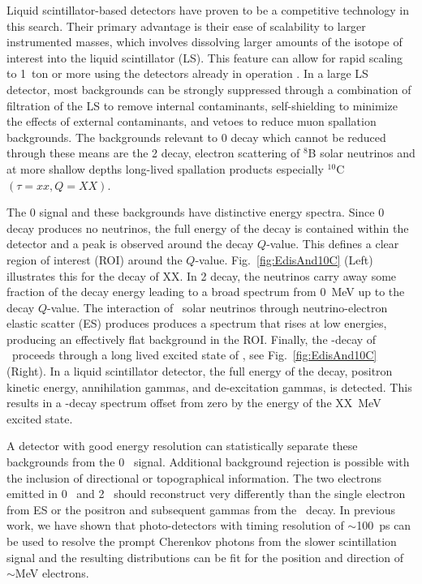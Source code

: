 Liquid scintillator-based detectors have
proven to be a competitive technology in this search\cite{KamLANDZen2013}. Their primary advantage is their ease of scalability to
larger instrumented masses, which involves dissolving larger amounts of
the isotope of interest into the liquid scintillator (LS). This
feature can allow for rapid scaling to 1~ton or more using the
detectors already in operation \cite{Biller2013}. In a large LS
detector, most backgrounds can be strongly suppressed through a
combination of filtration of the LS to remove internal contaminants,
self-shielding to minimize the effects of external contaminants, and
vetoes to reduce muon spallation backgrounds. The backgrounds relevant to
0{\nbb} decay which cannot be reduced through these means are the
2{\nbb} decay, electron scattering of $^8$B solar neutrinos and at more shallow depths long-lived spallation products especially $^{10}$C$(\tau=xx, Q=XX)$.



The 0{\nbb} signal and these backgrounds have distinctive energy spectra. Since 0{\nbb} decay produces no neutrinos, the full energy of the
decay is contained within the detector and a peak is observed around the decay $Q$-value. This defines a clear region of interest (ROI) around the $Q$-value.  Fig.~\ref{fig:EdisAnd10C} (Left) illustrates this for the \nbb decay of XX. In 2{\nbb} decay, the neutrinos carry away some fraction of the decay energy leading to a broad spectrum from 0~MeV up to the decay $Q$-value. The interaction of \B~solar neutrinos through neutrino-electron elastic scatter (ES) produces produces a spectrum that rises at low energies, producing an effectively flat background in the ROI. Finally, the \bpd-decay of \C~proceeds through a long lived excited state of \Bten,  see Fig.~\ref{fig:EdisAnd10C} (Right). In a liquid scintillator detector, the full energy of the decay, positron kinetic energy, annihilation gammas, and de-excitation gammas, is detected. This results in a \bmd-decay spectrum offset from zero by the energy of the XX~MeV excited state.

A detector with good energy resolution can statistically separate these backgrounds from the 0\nbb~ signal. Additional background rejection is possible with the inclusion of directional or topographical information. The two electrons emitted in 0\nbb~ and 2\nbb~ should reconstruct very differently than the single electron from ES or the positron and subsequent  gammas from the \C~decay. In previous work, we have shown that photo-detectors with timing resolution of $\sim$100~ps can be used to resolve the prompt Cherenkov photons from the slower scintillation signal and the resulting distributions can be fit for the position and direction of $\sim$MeV electrons\cite{Aberle2014}. 

